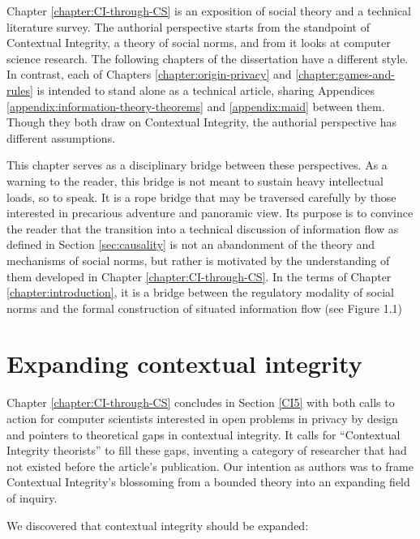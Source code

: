 \documentclass[../thesis.tex]{subfiles}
\begin{document}
 Chapter \ref{chapter:CI-through-CS} is an exposition of social theory and a technical literature survey.
 The authorial perspective starts from the standpoint of
 Contextual Integrity, a theory of social norms,
 and from it looks at computer science research.
 The following chapters of the dissertation have
 a different style.
 In contrast, each of Chapters \ref{chapter:origin-privacy} and
 \ref{chapter:games-and-rules} is intended to stand alone as a
 technical article, sharing Appendices
 \ref{appendix:information-theory-theorems}
 and \ref{appendix:maid} between them.
 Though they both draw on Contextual Integrity, the authorial perspective has different assumptions.

 This chapter serves as a disciplinary bridge between these perspectives.
 As a warning to the reader, this bridge is not meant to sustain heavy intellectual loads, so to speak.
 It is a rope bridge that may be traversed carefully by those interested in precarious adventure and panoramic view.
 Its purpose is to convince the reader that the transition
 into a technical discussion of information flow as defined
 in Section \ref{sec:causality} is not an abandonment of
 the theory and mechanisms of social norms, but rather is
 motivated by the understanding of them developed in
 Chapter \ref{chapter:CI-through-CS}.
 In the terms of Chapter \ref{chapter:introduction}, it
 is a bridge between the regulatory modality of social norms
 and the formal construction of situated information flow
 (see Figure 1.1)

\section{Expanding contextual integrity}

Chapter \ref{chapter:CI-through-CS} concludes in Section \ref{CI5} with both calls to action for computer scientists interested in open problems in privacy by design and pointers to theoretical gaps in contextual integrity.
 It calls for ``Contextual Integrity theorists'' to fill these gaps, inventing a category of researcher that had not existed before the article's publication.
 Our intention as authors was to frame Contextual Integrity's blossoming from a bounded theory into an expanding field of inquiry.
 
 We discovered that contextual integrity should be expanded:
\end{document}
